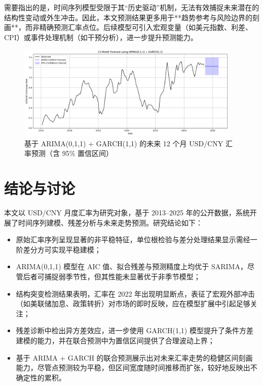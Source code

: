 \documentclass[11pt,a4paper]{article}
\begin{document}
需要指出的是，时间序列模型受限于其“历史驱动”机制，无法有效捕捉未来潜在的结构性变动或外生冲击。因此，本文预测结果更多用于**趋势参考与风险边界的刻画**，而非精确预测汇率点位。后续模型可引入宏观变量（如美元指数、利差、CPI）或事件处理机制（如干预分析），进一步提升预测能力。

\begin{figure}[H]
  \centering
  \includegraphics[width=0.95\textwidth]{./figures/forecast_arima_garch.png}
  \caption{基于 ARIMA(0,1,1) + GARCH(1,1) 的未来 12 个月 USD/CNY 汇率预测（含 95\% 置信区间）}
  \label{fig:forecast-arima-garch}
\end{figure}


\section{结论与讨论}

本文以 USD/CNY 月度汇率为研究对象，基于 2013–2025 年的公开数据，系统开展了时间序列建模、残差分析与未来走势预测。研究结论如下：

\begin{itemize}
  \item 原始汇率序列呈现显著的非平稳特征，单位根检验与差分处理结果显示需经一阶差分方可实现平稳建模；
  \item ARIMA(0,1,1) 模型在 AIC 值、拟合残差与预测精度上均优于 SARIMA，尽管后者可捕捉弱季节性，但其性能未显著优于非季节模型；
  \item 结构突变检测结果表明，汇率在 2022 年出现明显断点，表征了宏观外部冲击（如美联储加息、政策转折）对市场的即时反映，应在模型扩展中引起足够关注；
  \item 残差诊断中检出异方差效应，进一步使用 GARCH(1,1) 模型提升了条件方差建模的能力，并在联合预测中为置信区间提供了合理波动上界；
  \item 基于 ARIMA + GARCH 的联合预测展示出对未来汇率走势的稳健区间刻画能力，尽管点预测较为平稳，但区间宽度随时间推移而扩张，较好地反映出不确定性的累积。
\end{itemize}
\end{document}
